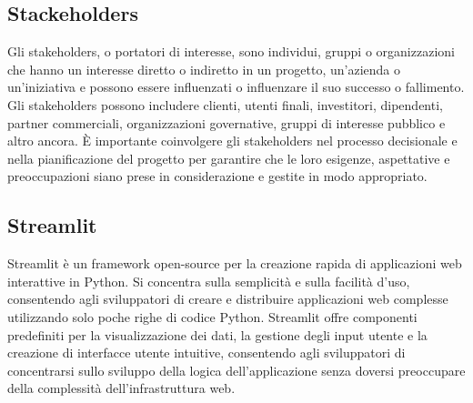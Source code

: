 \vspace{2em}
\subsection*{Stackeholders}
Gli stakeholders, o portatori di interesse, sono individui, gruppi o organizzazioni che hanno un interesse diretto o indiretto in un progetto, un'azienda o un'iniziativa e possono essere influenzati o influenzare il suo successo o fallimento. Gli stakeholders possono includere clienti, utenti finali, investitori, dipendenti, partner commerciali, organizzazioni governative, gruppi di interesse pubblico e altro ancora. È importante coinvolgere gli stakeholders nel processo decisionale e nella pianificazione del progetto per garantire che le loro esigenze, aspettative e preoccupazioni siano prese in considerazione e gestite in modo appropriato.

\vspace{2em}
\subsection*{Streamlit}
Streamlit è un framework open-source per la creazione rapida di applicazioni web interattive in Python. Si concentra sulla semplicità e sulla facilità d'uso, consentendo agli sviluppatori di creare e distribuire applicazioni web complesse utilizzando solo poche righe di codice Python. Streamlit offre componenti predefiniti per la visualizzazione dei dati, la gestione degli input utente e la creazione di interfacce utente intuitive, consentendo agli sviluppatori di concentrarsi sullo sviluppo della logica dell'applicazione senza doversi preoccupare della complessità dell'infrastruttura web.



